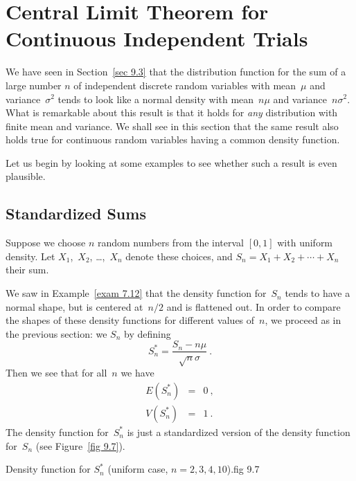 \section[Continuous Independent Trials]{Central Limit Theorem for 
Continuous Independent Trials}
\label{sec 9.4}
We have seen in Section~\ref{sec 9.3} that the distribution function for the sum of
a large number $n$ of independent discrete random variables with mean~$\mu$ and
variance~$\sigma^2$ tends to look like a normal density with mean~$n\mu$ and
variance~$n\sigma^2$.   What is remarkable about this result is that it holds for {\em any}
distribution with finite mean and variance.  We shall see in this section that the same result
also holds true for continuous random variables having a common density function.
\par
Let us begin by looking at some examples to see whether such a result is even
plausible.

\subsection*{Standardized Sums}
\begin{example}
Suppose we choose $n$ random numbers from the interval $[0,1]$ with uniform
density.  Let $X_1$,~$X_2$, \dots,~$X_n$ denote these choices, and $S_n = X_1 +
X_2 +\cdots+ X_n$ their sum.

We saw in Example~\ref{exam 7.12} that the density function for~$S_n$ tends
to have a normal shape, but is centered at~$n/2$ and is flattened out.  In order
to compare the shapes of these density functions for different values of~$n$,
we proceed as in the previous section: we  $S_n$ by defining
$$
S_n^* = \frac {S_n - n\mu}{\sqrt n \sigma}\ .
$$
Then we see that for all~$n$ we have
\begin{eqnarray*}
E(S_n^*) & = & 0\ , \\
V(S_n^*) & = & 1\ .
\end{eqnarray*}
The density function for~$S_n^*$ is just a standardized version of the density
function for~$S_n$ (see Figure~\ref{fig 9.7}).
\end{example}

{Density function for $S^*_n$ (uniform case, $n = 2, 3, 4, 10$).}{fig 9.7} 


